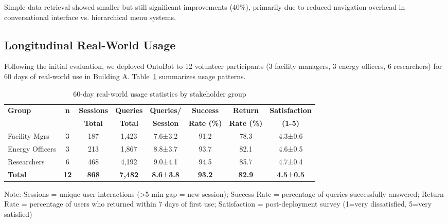 \documentclass[acmlarge]{acmart}
\begin{document}
Simple data retrieval showed smaller but still significant improvements (40\%), primarily due to reduced navigation overhead in conversational interface vs. hierarchical menu systems.

\subsection{Longitudinal Real-World Usage}

Following the initial evaluation, we deployed OntoBot to 12 volunteer participants (3 facility managers, 3 energy officers, 6 researchers) for 60 days of real-world use in Building A. Table~\ref{tab:usage-stats} summarizes usage patterns.

\begin{table}[h]
\centering
\begin{threeparttable}
\caption{60-day real-world usage statistics by stakeholder group}
\label{tab:usage-stats}
\scriptsize
\begin{tabular}{@{}lccccccc@{}}
\toprule
\textbf{Group} & \textbf{n} & \textbf{Sessions} & \textbf{Queries} & \textbf{Queries/} & \textbf{Success} & \textbf{Return} & \textbf{Satisfaction} \\
 & & \textbf{Total} & \textbf{Total} & \textbf{Session} & \textbf{Rate (\%)} & \textbf{Rate (\%)} & \textbf{(1-5)} \\
\midrule
Facility Mgrs & 3 & 187 & 1,423 & 7.6±3.2 & 91.2 & 78.3 & 4.3±0.6 \\
Energy Officers & 3 & 213 & 1,867 & 8.8±3.7 & 93.7 & 82.1 & 4.6±0.5 \\
Researchers & 6 & 468 & 4,192 & 9.0±4.1 & 94.5 & 85.7 & 4.7±0.4 \\
\midrule
\textbf{Total} & \textbf{12} & \textbf{868} & \textbf{7,482} & \textbf{8.6±3.8} & \textbf{93.2} & \textbf{82.9} & \textbf{4.5±0.5} \\
\bottomrule
\end{tabular}
\begin{tablenotes}
\small
\item Note: Sessions = unique user interactions (>5 min gap = new session); Success Rate = percentage of queries successfully answered; Return Rate = percentage of users who returned within 7 days of first use; Satisfaction = post-deployment survey (1=very dissatisfied, 5=very satisfied)
\end{tablenotes}
\end{threeparttable}
\end{table}
\end{document}
